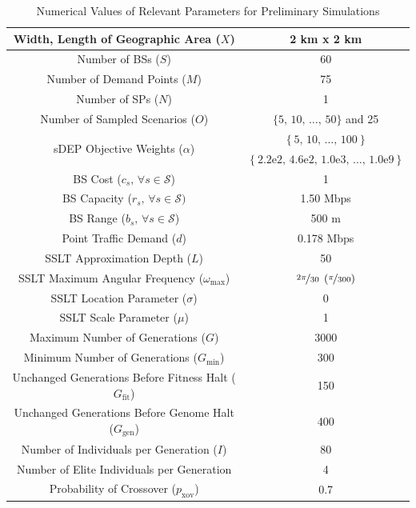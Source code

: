 \documentclass[12pt,dvipsnames]{report}
\newcommand{\expnumber}[2]{{#1}\mathrm{e}{#2}}
\begin{document}
\begin{table}[!htp]
	\centering
	\caption{Numerical Values of Relevant Parameters for Preliminary Simulations}
	\begin{tabular}{|c|c|} 
		\hline
		Width, Length of Geographic Area ($X$) & 2 km x 2 km \\
		\hline
		Number of BSs ($S$) & 60 \\ 
		\hline 
		Number of Demand Points ($M$) & 75 \\ 
		\hline 
		Number of SPs ($N$) & 1 \\
		\hline
		Number of Sampled Scenarios ($O$) & $\{5,\, 10,\, \ldots,\, 50\}$ and 25 \\ 
		\hline 
		\multirow{2}{*}{sDEP Objective Weights ($\alpha$)} & $\left\{ 5,\, 10,\, \ldots,\, 100 \right\}$ \\
		& $\left\{ \expnumber{2.2}{2},\, \expnumber{4.6}{2},\, \expnumber{1.0}{3},\, \ldots,\, \expnumber{1.0}{9} \right\}$ \\
		\hline
		BS Cost ($c_s,\, \forall s \in \mathcal{S}$) & 1 \\ 
		\hline 
		BS Capacity ($r_s,\, \forall s \in \mathcal{S})$ & 1.50 Mbps \\ 
		\hline
		BS Range ($b_s,\, \forall s \in \mathcal{S}$) & 500 m \\
		\hline 
		Point Traffic Demand ($d$) & 0.178 Mbps \\ 
		\hline 
		\hline
		SSLT Approximation Depth ($L$) & 50 \\ 
		\hline
		SSLT Maximum Angular Frequency ($\omega_{\max}$) & $\nicefrac{2 \pi}{30} \; \left( \nicefrac{\pi}{300} \right)$ \\
		\hline 
		SSLT Location Parameter ($\sigma$) & 0 \\ 
		\hline 
		SSLT Scale Parameter ($\mu$) & 1 \\ 
		\hline 
		\hline
		Maximum Number of Generations ($G$) & 3000 \\ 
		\hline
		Minimum Number of Generations ($G_{\min}$) & 300 \\
		\hline
		Unchanged Generations Before Fitness Halt ($G_{\text{fit}}$) & 150 \\
		\hline 
		Unchanged Generations Before Genome Halt ($G_{\text{gen}}$) & 400 \\
		\hline 
		Number of Individuals per Generation ($I$) & 80 \\ 
		\hline
		Number of Elite Individuals per Generation & 4 \\
		\hline 
		Probability of Crossover ($p_\text{xov}$) & 0.7 \\ 

\end{tabular}
\end{table}
\end{document}
